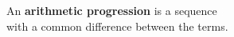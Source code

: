\documentclass[border=6pt]{standalone}
\begin{document}
\parbox{3in}{An \textbf{arithmetic progression} is a sequence \\
with a common difference between the terms.}
\end{document}
